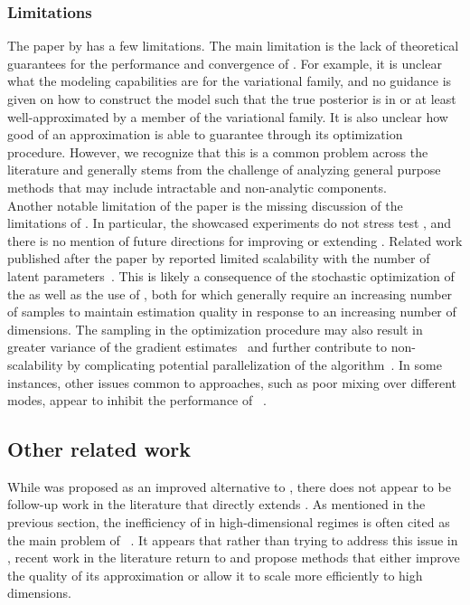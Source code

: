 \documentclass[10pt]{article}
\begin{document}
\subsubsection{Limitations}

The paper by \citet{Titsias:2019} has a few limitations. The main limitation is the lack of theoretical guarantees for the performance and convergence of \uivi. For example, it is unclear what the modeling capabilities are for the \uivi variational family, and no guidance is given on how to construct the model such that the true posterior is in or at least well-approximated by a member of the variational family. It is also unclear how good of an approximation \uivi is able to guarantee through its optimization procedure. However, we recognize that this is a common problem across the \vi literature and generally stems from the challenge of analyzing general purpose methods that may include intractable and non-analytic components.
\\

Another notable limitation of the paper is the missing discussion of the limitations of \uivi. In particular, the showcased experiments do not stress test \uivi, and there is no mention of future directions for improving or extending \uivi. Related work published after the paper by \citet{Titsias:2019} reported limited scalability with the number of latent parameters~\citep{Molchanova:2019,Moens:2021}. This is likely a consequence of the stochastic optimization of the \elbo as well as the use of \mcmc, both for which generally require an increasing number of samples to maintain estimation quality in response to an increasing number of dimensions. The \mcmc sampling in the \uivi optimization procedure may also result in greater variance of the \elbo gradient estimates~\citep{Betancourt:2015} and further contribute to non-scalability by complicating potential parallelization of the algorithm~\citep{Sobolev:2019}. In some instances, other issues common to \mcmc approaches, such as poor mixing over different modes, appear to inhibit the performance of \uivi~\citep{Sobolev:2019}.


\subsection{Other related work} \label{an:postpaper}

While \uivi was proposed as an improved alternative to \sivi, there does not appear to be follow-up work in the literature that directly extends \uivi. As mentioned in the previous section, the inefficiency of \mcmc in high-dimensional regimes is often cited as the main problem of \uivi~\citep{Molchanova:2019,Moens:2021}. It appears that rather than trying to address this issue in \uivi, recent work in the literature return to \sivi and propose methods that either improve the quality of its approximation or allow it to scale more efficiently to high dimensions.
\\
\end{document}
